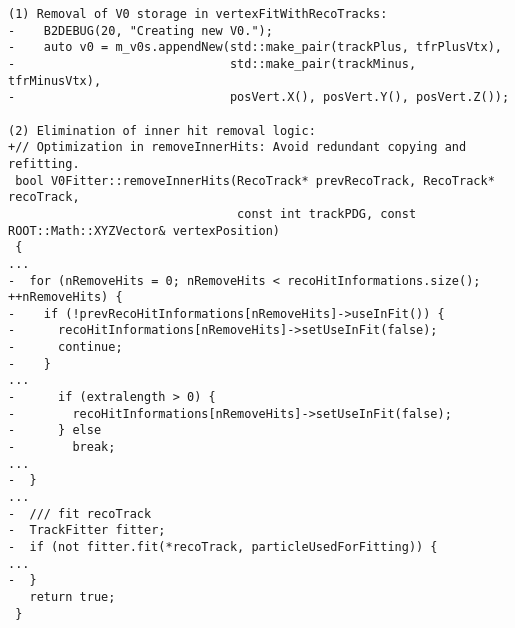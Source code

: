 \begin{verbatim}
(1) Removal of V0 storage in vertexFitWithRecoTracks:
-    B2DEBUG(20, "Creating new V0.");
-    auto v0 = m_v0s.appendNew(std::make_pair(trackPlus, tfrPlusVtx),
-                              std::make_pair(trackMinus, tfrMinusVtx),
-                              posVert.X(), posVert.Y(), posVert.Z());

(2) Elimination of inner hit removal logic:
+// Optimization in removeInnerHits: Avoid redundant copying and refitting.
 bool V0Fitter::removeInnerHits(RecoTrack* prevRecoTrack, RecoTrack* recoTrack,
                                const int trackPDG, const ROOT::Math::XYZVector& vertexPosition)
 {
...
-  for (nRemoveHits = 0; nRemoveHits < recoHitInformations.size(); ++nRemoveHits) {
-    if (!prevRecoHitInformations[nRemoveHits]->useInFit()) {
-      recoHitInformations[nRemoveHits]->setUseInFit(false);
-      continue;
-    }
...
-      if (extralength > 0) {
-        recoHitInformations[nRemoveHits]->setUseInFit(false);
-      } else
-        break;
...
-  }
...
-  /// fit recoTrack
-  TrackFitter fitter;
-  if (not fitter.fit(*recoTrack, particleUsedForFitting)) {
...
-  }
   return true;
 }

\end{verbatim}